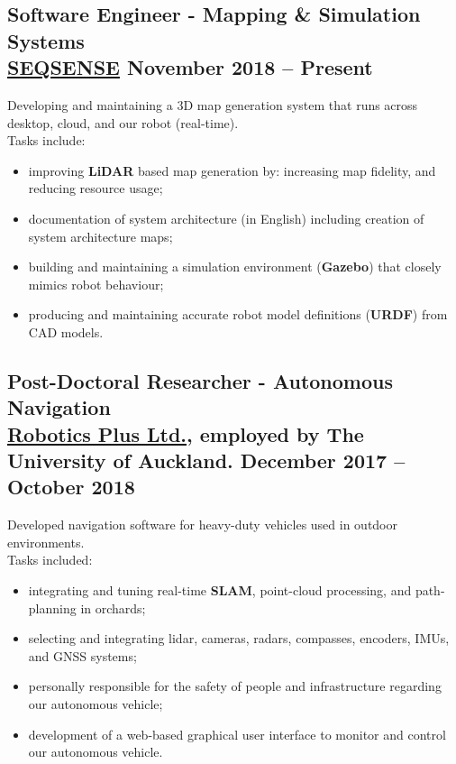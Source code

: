 \documentclass[english]{extarticle}
\begin{document}
\subsection*{Software Engineer - Mapping \& Simulation Systems\\\textmd{\footnotesize \href{https://www.seqsense.com/}{SEQSENSE} \hfill{} \textbf{November 2018 -- Present}}}
Developing and maintaining a 3D map generation system that runs across desktop, cloud, and our robot (real-time).
\\Tasks include:
\begin{itemize}
    \item improving \textbf{LiDAR} based map generation by: increasing map fidelity, and reducing resource usage;
    \item documentation of system architecture (in English) including creation of system architecture maps;
    \item building and maintaining a simulation environment (\textbf{Gazebo}) that closely mimics robot behaviour;
    \item producing and maintaining accurate robot model definitions (\textbf{URDF}) from CAD models.
\end{itemize}

\subsection*{Post-Doctoral Researcher - Autonomous Navigation\\\textmd{\footnotesize \href{https://www.roboticsplus.co.nz/}{Robotics Plus Ltd.}, employed by The University of Auckland. \hfill{} \textbf{December 2017 -- October 2018}}}
Developed navigation software for heavy-duty vehicles used in outdoor environments.
\\Tasks included:
\begin{itemize}
    \item integrating and tuning real-time \textbf{SLAM}, point-cloud processing, and path-planning in orchards;
    \item selecting and integrating lidar, cameras, radars, compasses, encoders, IMUs, and GNSS systems;
    \item personally responsible for the safety of people and infrastructure regarding our autonomous vehicle;
    \item development of a web-based graphical user interface to monitor and control our autonomous vehicle.
\end{itemize}
\end{document}
